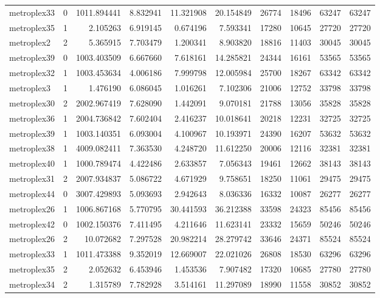 \begin{longtable}{|l|r|r|r|r|r|r|r|r|r|}
metroplex33 & 0 & 1011.894441 & 8.832941 & 11.321908 & 20.154849 & 26774 & 18496 & 63247 & 63247 \\
metroplex35 & 1 & 2.105263 & 6.919145 & 0.674196 & 7.593341 & 17280 & 10645 & 27720 & 27720 \\
metroplex2 & 2 & 5.365915 & 7.703479 & 1.200341 & 8.903820 & 18816 & 11403 & 30045 & 30045 \\
metroplex39 & 0 & 1003.403509 & 6.667660 & 7.618161 & 14.285821 & 24344 & 16161 & 53565 & 53565 \\
metroplex32 & 1 & 1003.453634 & 4.006186 & 7.999798 & 12.005984 & 25700 & 18267 & 63342 & 63342 \\
metroplex3 & 1 & 1.476190 & 6.086045 & 1.016261 & 7.102306 & 21006 & 12752 & 33798 & 33798 \\
metroplex30 & 2 & 2002.967419 & 7.628090 & 1.442091 & 9.070181 & 21788 & 13056 & 35828 & 35828 \\
metroplex36 & 1 & 2004.736842 & 7.602404 & 2.416237 & 10.018641 & 20218 & 12231 & 32725 & 32725 \\
metroplex39 & 1 & 1003.140351 & 6.093004 & 4.100967 & 10.193971 & 24390 & 16207 & 53632 & 53632 \\
metroplex38 & 1 & 4009.082411 & 7.363530 & 4.248720 & 11.612250 & 20006 & 12116 & 32381 & 32381 \\
metroplex40 & 1 & 1000.789474 & 4.422486 & 2.633857 & 7.056343 & 19461 & 12662 & 38143 & 38143 \\
metroplex31 & 2 & 2007.934837 & 5.086722 & 4.671929 & 9.758651 & 18250 & 11061 & 29475 & 29475 \\
metroplex44 & 0 & 3007.429893 & 5.093693 & 2.942643 & 8.036336 & 16332 & 10087 & 26277 & 26277 \\
metroplex26 & 1 & 1006.867168 & 5.770795 & 30.441593 & 36.212388 & 33598 & 24323 & 85456 & 85456 \\
metroplex42 & 0 & 1002.150376 & 7.411495 & 4.211646 & 11.623141 & 23332 & 15659 & 50246 & 50246 \\
metroplex26 & 2 & 10.072682 & 7.297528 & 20.982214 & 28.279742 & 33646 & 24371 & 85524 & 85524 \\
metroplex33 & 1 & 1011.473388 & 9.352019 & 12.669007 & 22.021026 & 26808 & 18530 & 63296 & 63296 \\
metroplex35 & 2 & 2.052632 & 6.453946 & 1.453536 & 7.907482 & 17320 & 10685 & 27780 & 27780 \\
metroplex34 & 2 & 1.315789 & 7.782928 & 3.514161 & 11.297089 & 18990 & 11558 & 30852 & 30852 \\

\end{longtable}
